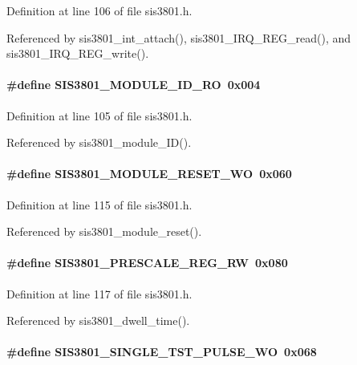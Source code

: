 Definition at line 106 of file sis3801.h.

Referenced by sis3801\_\-int\_\-attach(), sis3801\_\-IRQ\_\-REG\_\-read(), and sis3801\_\-IRQ\_\-REG\_\-write().
\paragraph[{SIS3801\_\-MODULE\_\-ID\_\-RO}]{\setlength{\rightskip}{0pt plus 5cm}\#define SIS3801\_\-MODULE\_\-ID\_\-RO~0x004}\hfill\label{sis3801_8h_a757b7ce397693914045489bc83c1d64a}


Definition at line 105 of file sis3801.h.

Referenced by sis3801\_\-module\_\-ID().
\paragraph[{SIS3801\_\-MODULE\_\-RESET\_\-WO}]{\setlength{\rightskip}{0pt plus 5cm}\#define SIS3801\_\-MODULE\_\-RESET\_\-WO~0x060}\hfill\label{sis3801_8h_a5d3dc575a383f380e5a41fc536da57d5}


Definition at line 115 of file sis3801.h.

Referenced by sis3801\_\-module\_\-reset().
\paragraph[{SIS3801\_\-PRESCALE\_\-REG\_\-RW}]{\setlength{\rightskip}{0pt plus 5cm}\#define SIS3801\_\-PRESCALE\_\-REG\_\-RW~0x080}\hfill\label{sis3801_8h_aa9ffbcb022b9f623f249ffcbc35bd840}


Definition at line 117 of file sis3801.h.

Referenced by sis3801\_\-dwell\_\-time().
\paragraph[{SIS3801\_\-SINGLE\_\-TST\_\-PULSE\_\-WO}]{\setlength{\rightskip}{0pt plus 5cm}\#define SIS3801\_\-SINGLE\_\-TST\_\-PULSE\_\-WO~0x068}\hfill\label{sis3801_8h_a5962e89a1981d47590d4fad7f857cffa}


